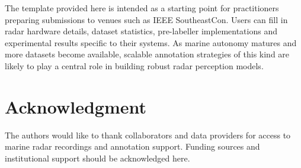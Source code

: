 \documentclass[twocolumn, 10pt]{article}
\begin{document}
The template provided here is intended as a starting point for practitioners preparing submissions to venues such as IEEE SoutheastCon. Users can fill in radar hardware details, dataset statistics, pre-labeller implementations and experimental results specific to their systems. As marine autonomy matures and more datasets become available, scalable annotation strategies of this kind are likely to play a central role in building robust radar perception models.

\section*{Acknowledgment}

The authors would like to thank collaborators and data providers for access to marine radar recordings and annotation support. Funding sources and institutional support should be acknowledged here.
\end{document}

